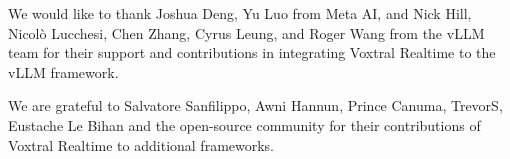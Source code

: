 \documentclass{article}
\begin{document}
We would like to thank Joshua Deng, Yu Luo from Meta AI, and Nick Hill, Nicolò Lucchesi, Chen Zhang, Cyrus Leung, and Roger Wang from the vLLM team for their support and contributions in integrating Voxtral Realtime to the vLLM framework.

We are grateful to Salvatore Sanfilippo, Awni Hannun, Prince Canuma, TrevorS, Eustache Le Bihan and the open-source community for their contributions of Voxtral Realtime to additional frameworks.

\clearpage



\clearpage

\appendix

\end{document}
